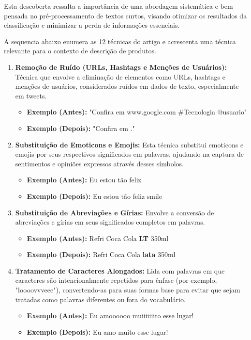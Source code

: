 Esta descoberta ressalta a importância de uma abordagem sistemática e bem pensada no pré-processamento de textos curtos, visando otimizar os resultados da classificação e minimizar a perda de informações essenciais.

A sequencia abaixo enumera as 12 técnicas do artigo \cite{naseem2021survey} e acrescenta uma técnica relevante para o contexto de descrição de produtos.

\begin{enumerate}
    \item \textbf{Remoção de Ruído (URLs, Hashtags e Menções de Usuários):} Técnica que envolve a eliminação de elementos como URLs, hashtags e menções de usuários, considerados ruídos em dados de texto, especialmente em tweets.
    \begin{itemize}
        \item \textbf{Exemplo (Antes):} "Confira em www.google.com \#Tecnologia @usuario"
        \item \textbf{Exemplo (Depois):} "Confira em ."
    \end{itemize}

    \item \textbf{Substituição de Emoticons e Emojis:} Esta técnica substitui emoticons e emojis por seus respectivos significados em palavras, ajudando na captura de sentimentos e opiniões expressos através desses símbolos.
    \begin{itemize}
        \item \textbf{Exemplo (Antes):} Eu estou tão feliz 
        \item \textbf{Exemplo (Depois):} Eu estou tão feliz smile
    \end{itemize}

    \item \textbf{Substituição de Abreviações e Gírias:} Envolve a conversão de abreviações e gírias em seus significados completos em palavras. 
    \begin{itemize}
        \item \textbf{Exemplo (Antes):} Refri Coca Cola \textbf{LT} 350ml
        \item \textbf{Exemplo (Depois):} Refri Coca Cola \textbf{lata} 350ml
    \end{itemize}

    \item \textbf{Tratamento de Caracteres Alongados:} Lida com palavras em que caracteres são intencionalmente repetidos para ênfase (por exemplo, "loooovvveee"), convertendo-as para suas formas base para evitar que sejam tratadas como palavras diferentes ou fora do vocabulário.
    \begin{itemize}
        \item \textbf{Exemplo (Antes):} Eu amoooooo muiiiiiiito esse lugar!
        \item \textbf{Exemplo (Depois):} Eu amo muito esse lugar!
    \end{itemize}


\end{enumerate}
